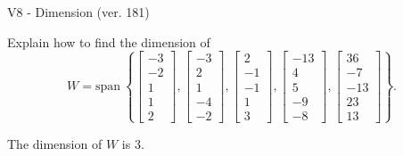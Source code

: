 \begin{exercise}
  \begin{exerciseTitle}V8 - Dimension (ver. 181)\end{exerciseTitle}
  \begin{exerciseStatement}
    Explain how to find the dimension of 
\[W=\mathrm{span}\ \left\{\left[\begin{array}{r}
-3 \\
-2 \\
1 \\
1 \\
2
\end{array}\right] , \left[\begin{array}{r}
-3 \\
2 \\
1 \\
-4 \\
-2
\end{array}\right] , \left[\begin{array}{r}
2 \\
-1 \\
-1 \\
1 \\
3
\end{array}\right] , \left[\begin{array}{r}
-13 \\
4 \\
5 \\
-9 \\
-8
\end{array}\right] , \left[\begin{array}{r}
36 \\
-7 \\
-13 \\
23 \\
13
\end{array}\right]\right\}.\]



  \end{exerciseStatement}
  \begin{exerciseAnswer}
   The dimension of \(W\) is  \(3\).
  


  \end{exerciseAnswer}
\end{exercise}